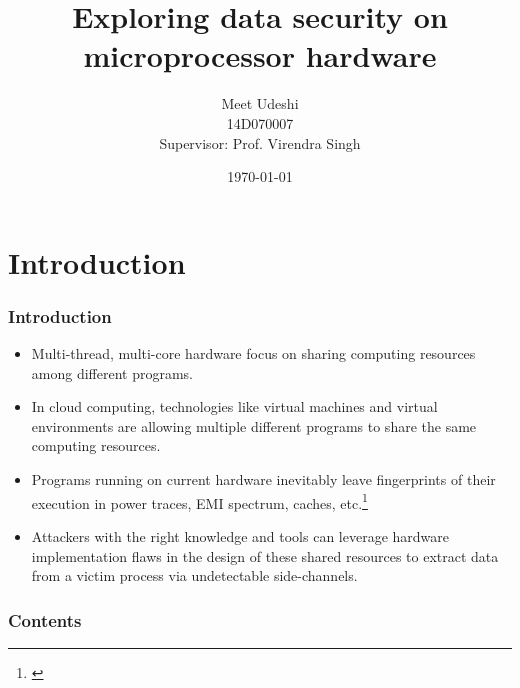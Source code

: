 \documentclass[10pt]{beamer}
\title[DDP Presentation]{Exploring data security on microprocessor hardware} %
\author{Meet Udeshi\\
14D070007\\
Supervisor: Prof. Virendra Singh} %
\institute[CADSL] %
{
CADSL - IIT Bombay\\ %
}
\date{\today} %
\begin{document}
\begin{frame}
\titlepage %
\end{frame}


\section{Introduction}


\begin{frame}
\frametitle{Introduction}
\begin{itemize}
    \item Multi-thread, multi-core hardware focus on sharing computing resources
        among different programs.
    \item In cloud computing, technologies like virtual machines and virtual environments
        are allowing multiple different programs to share the same computing resources.
    \item Programs running on current hardware inevitably leave fingerprints of
        their execution in power traces, EMI spectrum,
        caches, etc.\footnote{\cite{side_channel_intro}}
    \item Attackers with the right knowledge and tools can leverage hardware
        implementation flaws in the design of these shared resources
        to extract data from a victim process via undetectable side-channels.
\end{itemize}
\end{frame}

\begin{frame}
\frametitle{Contents} %
\tableofcontents %
\end{frame}
\end{document}
